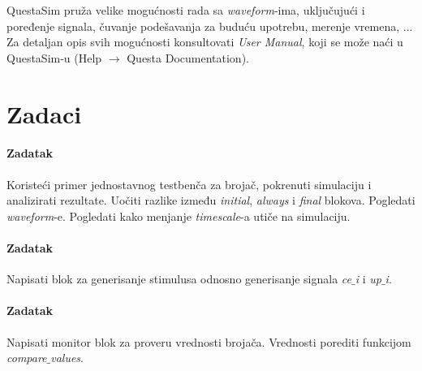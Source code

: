 QuestaSim pruža velike mogućnosti rada sa \emph{waveform}-ima, uključujući i
poređenje signala, čuvanje podešavanja za buduću upotrebu, merenje vremena, ...
Za detaljan opis svih mogućnosti konsultovati \emph{User Manual}, koji se može
naći u QuestaSim-u (Help \(\rightarrow\) Questa Documentation).


\section{Zadaci}

\paragraph{Zadatak}

Koristeći primer jednostavnog testbenča za brojač, pokrenuti simulaciju i
analizirati rezultate.
Uočiti razlike između \emph{initial}, \emph{always} i \emph{final} blokova.
Pogledati \emph{waveform}-e.
Pogledati kako menjanje \emph{timescale}-a utiče na simulaciju.

\paragraph{Zadatak}

Napisati blok za generisanje stimulusa odnosno generisanje signala
\emph{ce\(\_\)i} i \emph{up\(\_\)i}.

\paragraph{Zadatak}

Napisati monitor blok za proveru vrednosti brojača.
Vrednosti porediti funkcijom \emph{compare\(\_\)values}.


